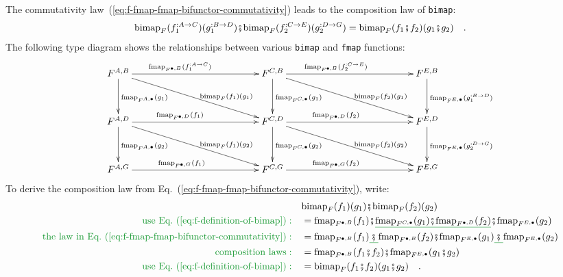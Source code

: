 The commutativity law~(\ref{eq:f-fmap-fmap-bifunctor-commutativity})
leads to the composition law of \lstinline!bimap!:
\begin{equation}
\text{bimap}_{F}(f_{1}^{:A\rightarrow C})(g_{1}^{:B\rightarrow D})\bef\text{bimap}_{F}(f_{2}^{:C\rightarrow E})(g_{2}^{:D\rightarrow G})=\text{bimap}_{F}(f_{1}\bef f_{2})(g_{1}\bef g_{2})\quad.\label{eq:f-bimap-composition-law}
\end{equation}
The following type diagram shows the relationships between various
\lstinline!bimap! and \lstinline!fmap! functions:
\[
\xymatrix{\xyScaleY{3.0pc}\xyScaleX{11.0pc}F^{A,B}\ar[rd]\sp(0.6){~~~\text{bimap}_{F}(f_{1})(g_{1})}\ar[r]\sp(0.4){\text{fmap}_{F^{\bullet,B}}(f_{1}^{:A\rightarrow C})}\ar[d]\sp(0.5){\text{fmap}_{F^{A,\bullet}}(g_{1})} & F^{C,B}\ar[rd]\sp(0.6){~~~\text{bimap}_{F}(f_{2})(g_{1})}\ar[r]\sp(0.4){~\text{fmap}_{F^{\bullet,B}}(f_{2}^{:C\rightarrow E})}\ar[d]\sp(0.5){\text{fmap}_{F^{C,\bullet}}(g_{1})~~~} & F^{E,B}\ar[d]\sp(0.5){\text{fmap}_{F^{E,\bullet}}(g_{1}^{:B\rightarrow D})}\\
F^{A,D}\ar[rd]\sp(0.6){~~~\text{bimap}_{F}(f_{1})(g_{2})}\ar[r]\sp(0.4){\text{fmap}_{F^{\bullet,D}}(f_{1})}\ar[d]\sp(0.5){\text{fmap}_{F^{A,\bullet}}(g_{2})} & F^{C,D}\ar[rd]\sp(0.6){~~~\text{bimap}_{F}(f_{2})(g_{2})}\ar[r]\sp(0.4){~\text{fmap}_{F^{\bullet,D}}(f_{2})}\ar[d]\sp(0.5){\text{fmap}_{F^{C,\bullet}}(g_{2})~~~} & F^{E,D}\ar[d]\sp(0.5){\text{fmap}_{F^{E,\bullet}}(g_{2}^{:D\rightarrow G})}\\
F^{A,G}\ar[r]\sp(0.4){~\text{fmap}_{F^{\bullet,G}}(f_{1})} & F^{C,G}\ar[r]\sp(0.4){~\text{fmap}_{F^{\bullet,G}}(f_{2})} & F^{E,G}
}
\]
To derive the composition law from Eq.~(\ref{eq:f-fmap-fmap-bifunctor-commutativity}),
write:
\begin{align*}
 & \text{bimap}_{F}(f_{1})(g_{1})\bef\text{bimap}_{F}(f_{2})(g_{2})\\
{\color{greenunder}\text{use Eq.~(\ref{eq:f-definition-of-bimap})}:}\quad & =\text{fmap}_{F^{\bullet,B}}(f_{1})\bef\gunderline{\text{fmap}_{F^{C,\bullet}}(g_{1})\bef\text{fmap}_{F^{\bullet,D}}(f_{2})}\bef\text{fmap}_{F^{E,\bullet}}(g_{2})\\
{\color{greenunder}\text{the law in Eq.~(\ref{eq:f-fmap-fmap-bifunctor-commutativity})}:}\quad & =\text{fmap}_{F^{\bullet,B}}(f_{1})\gunderline{\,\bef\,}\text{fmap}_{F^{\bullet,B}}(f_{2})\bef\text{fmap}_{F^{E,\bullet}}(g_{1})\gunderline{\,\bef\,}\text{fmap}_{F^{E,\bullet}}(g_{2})\\
{\color{greenunder}\text{composition laws}:}\quad & =\text{fmap}_{F^{\bullet,B}}(f_{1}\bef f_{2})\bef\text{fmap}_{F^{E,\bullet}}(g_{1}\bef g_{2})\\
{\color{greenunder}\text{use Eq.~(\ref{eq:f-definition-of-bimap})}:}\quad & =\text{bimap}_{F}(f_{1}\bef f_{2})(g_{1}\bef g_{2})\quad.
\end{align*}
